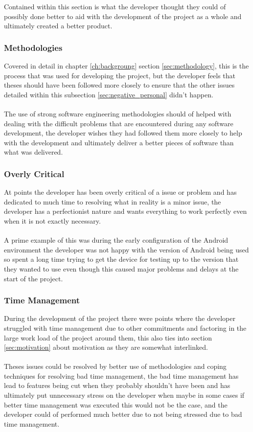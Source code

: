 Contained within this section is what the developer thought they could of possibly done better to aid with the development of the project as a whole and ultimately created a better product. 

\subsubsection{Methodologies}

Covered in detail in chapter \ref{ch:backgroung} section \ref{sec:methodology}, this is the process that was used for developing the project, but the developer feels that theses should have been followed more closely to ensure that the other issues detailed within this subsection \ref{sec:negative_personal} didn't happen.\\
\\
The use of strong software engineering methodologies should of helped with dealing with the difficult problems that are encountered during any software development, the developer wishes they had followed them more closely to help with the development and ultimately deliver a better pieces of software than what was delivered.

\subsubsection{Overly Critical}

At points the developer has been overly critical of a issue or problem and has dedicated to much time to resolving what in reality is a minor issue, the developer has a perfectionist nature and wants everything to work perfectly even when it is not exactly necessary.\\
\\
A prime example of this was during the early configuration of the Android environment the developer was not happy with the version of Android being used so spent a long time trying to get the device for testing up to the version that they wanted to use even though this caused major problems and delays at the start of the project.

\subsubsection{Time Management}
\label{sec:time_management}

During the development of the project there were points where the developer struggled with time management due to other commitments and factoring in the large work load of the project around them, this also ties into section \ref{sec:motivation} about motivation as they are somewhat interlinked.\\
\\
Theses issues could be resolved by better use of methodologies and coping techniques for resolving bad time management, the bad time management has lead to features being cut when they probably shouldn't have been and has ultimately put unnecessary stress on the developer when maybe in some cases if better time management was executed this would not be the case, and the developer could of performed much better due to not being stressed due to bad time management.

